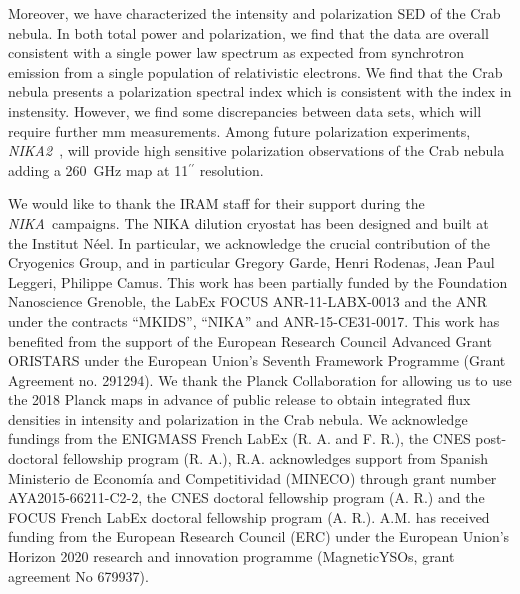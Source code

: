 \documentclass[twocolumn,traditabstract]{aa}
\def\NIKA{\textit{NIKA}}
\def\NIKAd{\textit{NIKA2}}
\begin{document}
Moreover, we have characterized the intensity and polarization SED of the Crab nebula. In both total power and polarization, we find that the data are overall consistent with a single power law spectrum as expected from synchrotron emission from a single population of relativistic electrons.
We find that the Crab nebula presents a polarization spectral index which is consistent with the index in instensity. 
However, we find some discrepancies between data sets, which will require further mm measurements. Among future polarization experiments, \NIKAd\ \citep{calvo2016}, will provide high sensitive polarization observations of the Crab nebula adding a 260~GHz map at 11$^{\prime\prime}$ resolution.



\vspace{0.2cm}
 \begin{acknowledgements}
We would like to thank the IRAM staff for their support during the \NIKA\ campaigns. 
The NIKA dilution cryostat has been designed and built at the Institut N\'eel. 
In particular, we acknowledge the crucial contribution of the Cryogenics Group, and 
in particular Gregory Garde, Henri Rodenas, Jean Paul Leggeri, Philippe Camus. 
This work has been partially funded by the Foundation Nanoscience Grenoble, the LabEx FOCUS ANR-11-LABX-0013 and 
the ANR under the contracts ``MKIDS'', ``NIKA'' and ANR-15-CE31-0017. 
This work has benefited from the support of the European Research Council Advanced Grant ORISTARS 
under the European Union's Seventh Framework Programme (Grant Agreement no. 291294).
We thank the Planck Collaboration for allowing us to use the 2018 Planck maps in advance of public release to obtain integrated flux densities in intensity and polarization in the Crab nebula. We acknowledge fundings from the ENIGMASS French LabEx (R. A. and F. R.), 
the CNES post-doctoral fellowship program (R. A.), R.A. acknowledges support from Spanish Ministerio de Econom\'ia and Competitividad (MINECO) through grant number AYA2015-66211-C2-2, the CNES doctoral fellowship program (A. R.) and
the FOCUS French LabEx doctoral fellowship program (A. R.).
A.M. has received funding from the European Research Council (ERC) under the European Union’s Horizon 2020 research and innovation programme (MagneticYSOs, grant agreement No 679937).
\end{acknowledgements}
\end{document}
